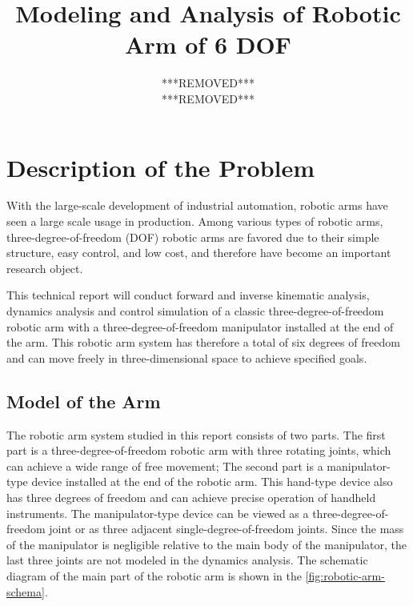 \documentclass{article}
\title{Modeling and Analysis of Robotic Arm of 6 DOF}
\author{***REMOVED*** \\ ***REMOVED***}
\begin{document}
\maketitle
\tableofcontents

\section{Description of the Problem}

With the large-scale development of industrial automation, robotic arms have seen a large scale usage in production.
Among various types of robotic arms, three-degree-of-freedom (DOF) robotic arms are favored due to their simple structure, easy control, and low cost, and therefore have become an important research object.

This technical report will conduct forward and inverse kinematic analysis, dynamics analysis and control simulation of a classic three-degree-of-freedom robotic arm with a three-degree-of-freedom manipulator installed at the end of the arm.
This robotic arm system has therefore a total of six degrees of freedom and can move freely in three-dimensional space to achieve specified goals.

\subsection{Model of the Arm}



The robotic arm system studied in this report consists of two parts.
The first part is a three-degree-of-freedom robotic arm with three rotating joints,
which can achieve a wide range of free movement;
The second part is a manipulator-type device installed at the end of the robotic arm.
This hand-type device also has three degrees of freedom and can achieve precise operation of handheld instruments.
The manipulator-type device can be viewed as a three-degree-of-freedom joint or as three adjacent single-degree-of-freedom joints.
Since the mass of the manipulator is negligible relative to the main body of the manipulator, the last three joints are not modeled in the dynamics analysis.
The schematic diagram of the main part of the robotic arm is shown in the \autoref{fig:robotic-arm-schema}.
\end{document}
